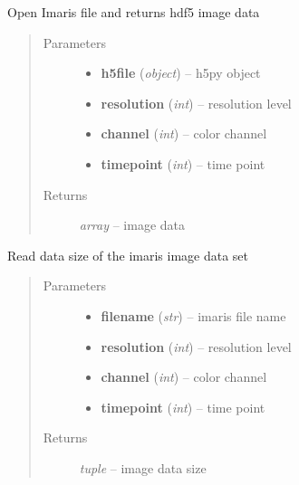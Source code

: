 \documentclass[letterpaper,10pt,english]{sphinxmanual}
\begin{document}
\begin{fulllineitems}
\label{api/ClearMap.IO:ClearMap.IO.Imaris.readDataSet}
Open Imaris file and returns hdf5 image data
\begin{quote}\begin{description}
\item[{Parameters}] \leavevmode\begin{itemize}
\item {} 
\textbf{h5file} (\emph{object}) --
h5py object

\item {} 
\textbf{resolution} (\emph{int}) --
resolution level

\item {} 
\textbf{channel} (\emph{int}) --
color channel

\item {} 
\textbf{timepoint} (\emph{int}) --
time point

\end{itemize}

\item[{Returns}] \leavevmode
\emph{array} --
image data

\end{description}\end{quote}

\end{fulllineitems}


\begin{fulllineitems}
\label{api/ClearMap.IO:ClearMap.IO.Imaris.dataSize}
Read data size of the imaris image data set
\begin{quote}\begin{description}
\item[{Parameters}] \leavevmode\begin{itemize}
\item {} 
\textbf{filename} (\emph{str}) --
imaris file name

\item {} 
\textbf{resolution} (\emph{int}) --
resolution level

\item {} 
\textbf{channel} (\emph{int}) --
color channel

\item {} 
\textbf{timepoint} (\emph{int}) --
time point

\end{itemize}

\item[{Returns}] \leavevmode
\emph{tuple} --
image data size

\end{description}\end{quote}

\end{fulllineitems}
\end{document}
